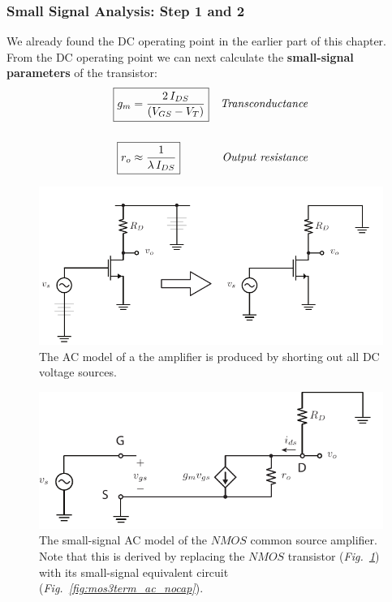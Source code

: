 \subsubsection{Small Signal Analysis:  Step 1 and 2}
We already found the DC operating point in the earlier part of this chapter.  From the DC operating point we can next calculate the \textbf{small-signal parameters} of the transistor:
    \begin{align*}
        \Aboxed{g_m &= \frac{2\,I_{DS}}{(V_{GS} - V_T)}} &\textit{Transconductance}\\[0.5cm]
        \Aboxed{r_o &\approx \frac{1}{\lambda\,I_{DS}}} &\textit{Output resistance}
    \end{align*}
\newpage
\begin{figure}[t]
\centering
\includegraphics[scale=1.15]{cs_amp_ac}
\caption{The AC model of a the amplifier is produced by shorting out all DC voltage sources.} \label{fig:cs_amp_ac}
\end{figure}
\begin{figure}[H]
\centering
\includegraphics[scale=1.25]{cs_amp_ss1}
\caption{The small-signal AC model of the $NMOS$ common source amplifier. Note that this is derived by replacing the $NMOS$ transistor (\emph{Fig.~\ref{fig:cs_amp_ac}}) with its small-signal equivalent circuit (\emph{Fig.~\ref{fig:mos3term_ac_nocap}}).}
\label{fig:cs_amp_ss1}
\end{figure}
